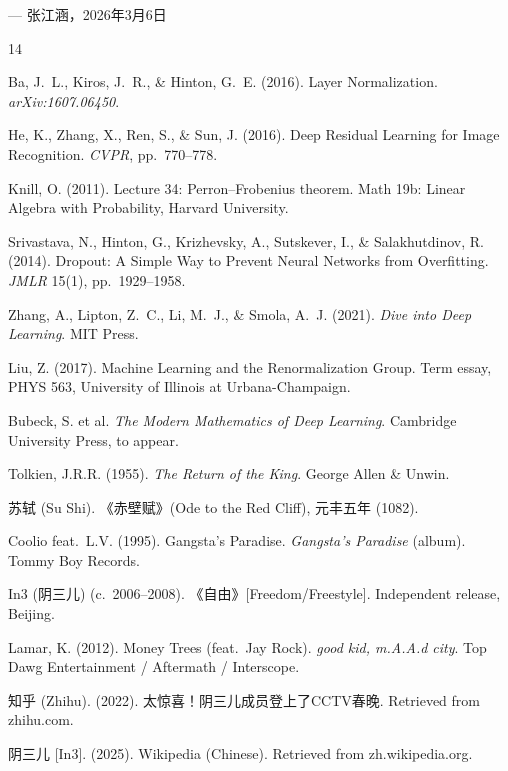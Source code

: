 \documentclass[11pt,a4paper]{article}
\theoremstyle{definition}
\theoremstyle{remark}
\begin{document}
\bigskip

\begin{flushright}
--- 张江涵，2026年3月6日
\end{flushright}


\begin{thebibliography}{14}

Ba, J.~L., Kiros, J.~R., \& Hinton, G.~E. (2016). Layer Normalization. \textit{arXiv:1607.06450}.

He, K., Zhang, X., Ren, S., \& Sun, J. (2016). Deep Residual Learning for Image Recognition. \textit{CVPR}, pp.~770--778.

Knill, O. (2011). Lecture 34: Perron--Frobenius theorem. Math 19b: Linear Algebra with Probability, Harvard University.

Srivastava, N., Hinton, G., Krizhevsky, A., Sutskever, I., \& Salakhutdinov, R. (2014). Dropout: A Simple Way to Prevent Neural Networks from Overfitting. \textit{JMLR} 15(1), pp.~1929--1958.

Zhang, A., Lipton, Z.~C., Li, M.~J., \& Smola, A.~J. (2021). \textit{Dive into Deep Learning}. MIT Press.

Liu, Z. (2017). Machine Learning and the Renormalization Group. Term essay, PHYS 563, University of Illinois at Urbana-Champaign.

Bubeck, S. et al. \textit{The Modern Mathematics of Deep Learning}. Cambridge University Press, to appear.

Tolkien, J.R.R. (1955). \textit{The Return of the King}. George Allen \& Unwin.

苏轼 (Su Shi). 《赤壁赋》(Ode to the Red Cliff), 元丰五年 (1082).

Coolio feat.\ L.V. (1995). Gangsta's Paradise. \textit{Gangsta's Paradise} (album). Tommy Boy Records.

In3 (阴三儿) (c.\ 2006--2008). 《自由》[Freedom/Freestyle]. Independent release, Beijing.

Lamar, K. (2012). Money Trees (feat.\ Jay Rock). \textit{good kid, m.A.A.d city}. Top Dawg Entertainment / Aftermath / Interscope.

知乎 (Zhihu). (2022). 太惊喜！阴三儿成员登上了CCTV春晚. Retrieved from zhihu.com.

阴三儿 [In3]. (2025). Wikipedia (Chinese). Retrieved from zh.wikipedia.org.

\end{thebibliography}
\end{document}
